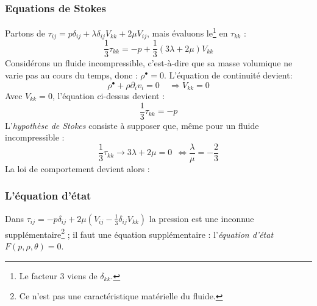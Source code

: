         \subsubsection{Equations de Stokes}
        Partons de $\tau_{ij} = p\delta_{ij} + \lambda\delta_{ij}V_{kk} + 2\mu V_{ij}$, mais
        évaluons le\footnote{Le facteur 3 viens de $\delta_{kk}$.} en $\tau_{kk}$ :
        \begin{equation}
        \frac{1}{3}\tau_{kk} = -p + \frac{1}{3}(3\lambda + 2\mu)V_{kk}
        \end{equation}
        Considérons un fluide incompressible, c'est-à-dire que sa masse volumique ne varie
        pas au cours du temps, donc : $\rho^\bullet = 0$. L'équation de continuité devient:
        \begin{equation}
        \rho^\bullet + \rho \partial_i v_i = 0\ \ \ \ \ \Rightarrow V_{kk} = 0
        \end{equation}
        Avec $V_{kk} = 0$, l'équation ci-dessus devient :
        \begin{equation}
        \frac{1}{3}\tau_{kk} = -p
        \end{equation}
        L'\textit{hypothèse de Stokes} consiste à supposer que, même pour un fluide 
        incompressible :
        \begin{equation}
        \frac{1}{3}\tau_{kk} \rightarrow 3\lambda + 2\mu = 0\ \ \Leftrightarrow 
        \frac{\lambda}{\mu} = -\frac{2}{3}
        \end{equation}
        La loi de comportement devient alors :\\
        
        
        
        \subsubsection{L'équation d'état}
        Dans $\tau_{ij} = -p\delta_{ij} + 2\mu\left(V_{ij} - \frac{1}{3}\delta_{ij}V_{kk}
        \right)$ la pression est une inconnue supplémentaire\footnote{Ce n'est pas une
        caractéristique matérielle du fluide.} ; il faut une équation supplémentaire :
        l'\textit{équation d'état} $F(p,\rho,\theta) = 0$.\\
        
